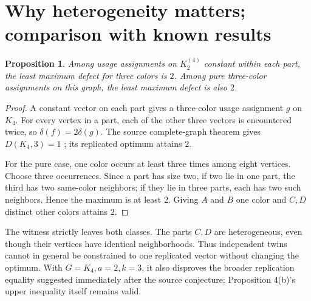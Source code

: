 \documentclass[11pt]{article}
\newtheorem{proposition}[theorem]{Proposition}
\begin{document}
\newpage
\section{Why heterogeneity matters; comparison with known results}
\begin{proposition}
Among usage assignments on $K_2^{(4)}$ constant within each part, the least
maximum defect for three colors is $2$. Among pure three-color assignments
on this graph, the least maximum defect is also $2$.
\end{proposition}
\begin{proof}
A constant vector on each part gives a three-color usage assignment $g$ on
$K_4$. For every vertex in a part, each of the other three vectors is
encountered twice, so $\delta(f)=2\delta(g)$.
The source complete-graph theorem gives $D(K_4,3)=1$
\cite[Proposition 1]{v2}; its replicated optimum attains $2$.

For the pure case, one color occurs at least three times among eight vertices.
Choose three occurrences. Since a part has size two, if two lie in one part,
the third has two same-color neighbors; if they lie in three parts, each has
two such neighbors. Hence the maximum is at least $2$. Giving $A$ and $B$
one color and $C,D$ distinct other colors attains $2$.
\end{proof}
The witness strictly leaves both classes. The parts $C,D$ are heterogeneous,
even though their vertices have identical neighborhoods. Thus independent
twins cannot in general be constrained to one replicated vector without
changing the optimum. With $G=K_4,a=2,k=3$, it also disproves the broader
replication equality suggested immediately after the source conjecture;
Proposition 4(b)'s upper inequality itself remains valid.
\end{document}
